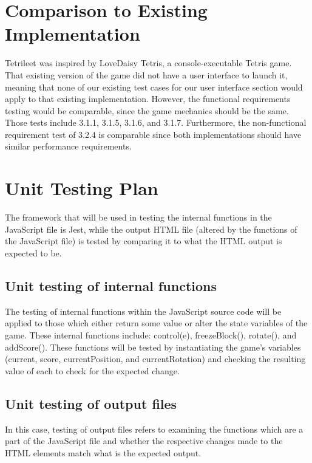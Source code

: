 \documentclass[12pt, titlepage]{article}
\begin{document}
\section{Comparison to Existing Implementation}	

Tetrileet was inspired by LoveDaisy Tetris, a console-executable Tetris game. That existing version of the game did not have a user interface to launch it, meaning that none of our existing test cases for our user interface section would apply to that existing implementation. However, the functional requirements testing would be comparable, since the game mechanics should be the same. Those tests include 3.1.1, 3.1.5, 3.1.6, and 3.1.7. Furthermore, the non-functional requirement test of 3.2.4 is comparable since both implementations should have similar performance requirements.   
				
\section{Unit Testing Plan}
		The framework that will be used in testing the internal functions in the JavaScript file is Jest, while the output HTML file (altered by the functions of the JavaScript file) is tested by comparing it to what the HTML output is expected to be.
		
\subsection{Unit testing of internal functions}
		The testing of internal functions within the JavaScript source code will be applied to those which either return some value or alter the state variables of the game. These internal functions include: control(e), freezeBlock(), rotate(), and addScore(). These functions will be tested by instantiating the game's variables (current, score, currentPosition, and currentRotation) and checking the resulting value of each to check for the expected change.
\subsection{Unit testing of output files}
        In this case, testing of output files refers to examining the functions which are a part of the JavaScript file and whether the respective changes made to the HTML elements match what is the expected output.




\end{document}
